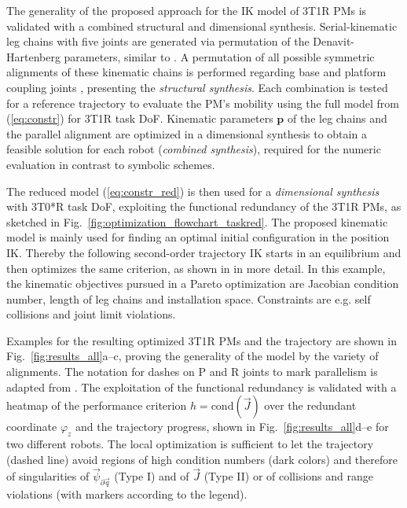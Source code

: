 \documentclass[
	graybox,
	vecphys] %
	{svmult}
\newcommand{\bm}[1]{\boldsymbol{#1}}
\newcommand{\vecResR}[0]{\vec{\psi}}
\begin{document}
The generality of the proposed approach for the IK model of 3T1R PMs is validated with a combined structural and dimensional synthesis.
Serial-kinematic leg chains with five joints are generated via permutation of the Denavit-Hartenberg parameters, similar to \cite{Gogu2008}. %
A permutation of all possible symmetric alignments of these kinematic chains is performed regarding base and platform coupling joints \cite{Gogu2008,KongGos2007,Merlet2006,BriotKha2015}, presenting the \emph{structural synthesis}.
Each combination is tested for a reference trajectory to evaluate the PM's mobility using the full model from (\ref{eq:constr}) for 3T1R task DoF.
Kinematic parameters $\bm{p}$ of the leg chains and the parallel alignment are optimized in a dimensional synthesis to obtain a feasible solution for each robot (\emph{combined synthesis}), required for the numeric evaluation in contrast to symbolic schemes.


The reduced model (\ref{eq:constr_red}) is then used for a \emph{dimensional synthesis} with 3T0*R task DoF, exploiting the functional redundancy of the 3T1R PMs, as sketched in Fig.~\ref{fig:optimization_flowchart_taskred}.
The proposed kinematic model is mainly used for finding an optimal initial configuration in the position IK.
Thereby the following second-order trajectory IK starts in an equilibrium and then optimizes the same criterion, as shown in \cite{SchapplerOrt2021} in more detail.
In this example, the kinematic objectives pursued in a Pareto optimization are Jacobian condition number, length of leg chains and installation space.
Constraints are e.g. self collisions and joint limit violations.

Examples for the resulting optimized 3T1R PMs and the trajectory are shown in Fig.~\ref{fig:results_all}a--c, proving the generality of the model by the variety of alignments.
The notation for dashes on P and R joints to mark parallelism is adapted from \cite{KongGos2007}.
The exploitation of the functional redundancy is validated with a heatmap of the performance criterion $h{=}\mathrm{cond}(\vec{J})$ over the redundant coordinate $\varphi_z$ and the trajectory progress, shown in Fig.~\ref{fig:results_all}d--e for two different robots.
The local optimization is sufficient to let the trajectory (dashed line) avoid regions of high condition numbers (dark colors) and therefore of singularities of $\vecResR_{\partial \vec{q}}$ (Type I) and of $\vec{J}$ (Type II) or of collisions and range violations (with markers according to the legend).
\end{document}
